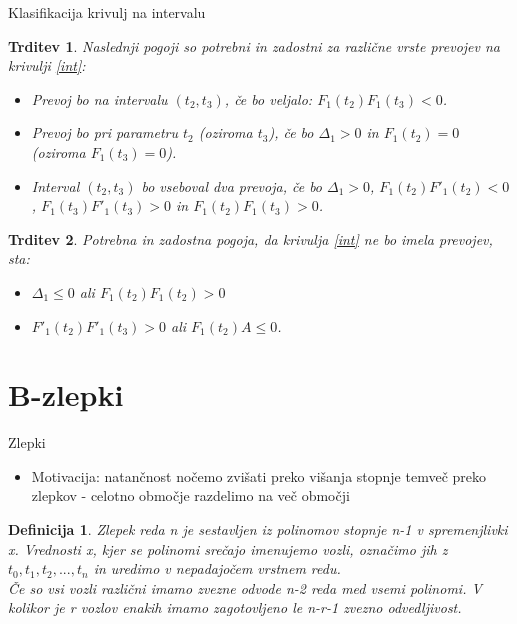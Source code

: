 \documentclass{beamer} %
\newtheorem{trditev}{Trditev}
\newtheorem{definicija}{Definicija}
\begin{document}
\begin{frame}{Klasifikacija krivulj na intervalu}
	\begin{trditev}
		Naslednji pogoji so potrebni in zadostni za različne vrste prevojev na krivulji \eqref{int}:
		\begin{itemize}
			\item Prevoj bo na intervalu $(t_2, t_3)$, če bo veljalo:
			$F_1(t_2)F_1(t_3) <0$.
			\item Prevoj bo pri parametru $t_2$ (oziroma $t_3$), če bo
			$\Delta_1 > 0$ in $F_1(t_2) = 0$ (oziroma $F_1(t_3) = 0$).
			\item Interval $(t_2, t_3)$ bo vseboval dva prevoja, če bo $\Delta_1 >0 $, $F_1(t_2)F'_1(t_2) <0$, $F_1(t_3)F'_1(t_3) >0$ in $F_1(t_2)F_1(t_3) >0$. 
		\end{itemize}
	\end{trditev}
	\begin{trditev}
		Potrebna in zadostna pogoja, da krivulja \eqref{int} ne bo imela prevojev, sta:
		\begin{itemize}
			\item $\Delta_1 \leq 0$ ali $F_1(t_2)F_1(t_2) > 0$
			\item $F'_1(t_2)F'_1(t_3)>0$ ali $F_1(t_2)A \leq 0$.
		\end{itemize}
	\end{trditev}
\end{frame}

\section{B-zlepki}
\begin{frame}{Zlepki}
	\begin{itemize}
		\item Motivacija: natančnost nočemo zvišati preko višanja stopnje temveč preko zlepkov - celotno območje razdelimo na več območji
	\end{itemize}
	\begin{definicija}
	Zlepek reda n je sestavljen iz polinomov stopnje n-1 v spremenjlivki x. Vrednosti x, kjer se polinomi srečajo imenujemo vozli, označimo jih z $t_0, t_1, t_2,...,t_n$ in uredimo v nepadajočem vrstnem redu. \\
	Če so vsi vozli različni imamo zvezne odvode n-2 reda med vsemi polinomi. V kolikor je r vozlov enakih imamo zagotovljeno le n-r-1 zvezno odvedljivost. 
	\end{definicija}
	
\end{frame}
\end{document}
